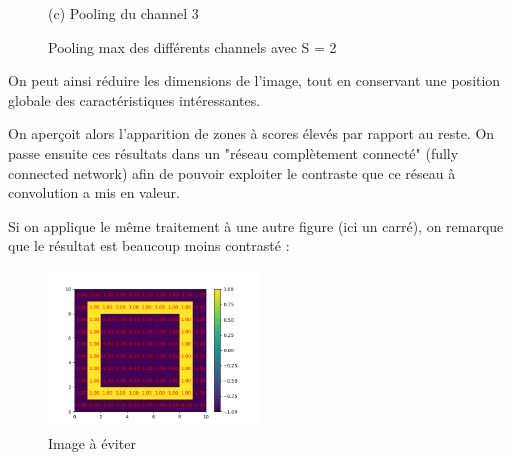 \begin{figure}[h]
        \center
        (c) Pooling du channel 3
    \endminipage
    \caption{Pooling max des différents channels avec S = 2}
\end{figure}

On peut ainsi réduire les dimensions de l'image, tout en conservant une position globale des caractéristiques intéressantes.

On aperçoit alors l'apparition de zones à scores élevés par rapport au reste.
On passe ensuite ces résultats dans un "réseau complètement connecté" (fully connected network) 
afin de pouvoir exploiter le contraste que ce réseau à convolution a mis en valeur.


Si on applique le même traitement à une autre figure (ici un carré), on remarque que le résultat est beaucoup moins contrasté :

\begin{figure}[h]
    \center
    \includegraphics[width=0.5\textwidth]{img/cnn_exemple/square/image_carre.png}
    \caption{Image à éviter}
\end{figure}


